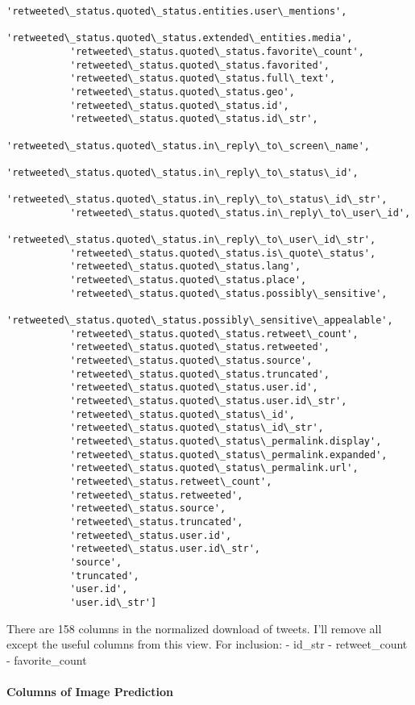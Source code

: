 \documentclass[11pt]{article}
\begin{document}
\begin{Verbatim}[commandchars=\\\{\}]
           'retweeted\_status.quoted\_status.entities.user\_mentions',
           'retweeted\_status.quoted\_status.extended\_entities.media',
           'retweeted\_status.quoted\_status.favorite\_count',
           'retweeted\_status.quoted\_status.favorited',
           'retweeted\_status.quoted\_status.full\_text',
           'retweeted\_status.quoted\_status.geo',
           'retweeted\_status.quoted\_status.id',
           'retweeted\_status.quoted\_status.id\_str',
           'retweeted\_status.quoted\_status.in\_reply\_to\_screen\_name',
           'retweeted\_status.quoted\_status.in\_reply\_to\_status\_id',
           'retweeted\_status.quoted\_status.in\_reply\_to\_status\_id\_str',
           'retweeted\_status.quoted\_status.in\_reply\_to\_user\_id',
           'retweeted\_status.quoted\_status.in\_reply\_to\_user\_id\_str',
           'retweeted\_status.quoted\_status.is\_quote\_status',
           'retweeted\_status.quoted\_status.lang',
           'retweeted\_status.quoted\_status.place',
           'retweeted\_status.quoted\_status.possibly\_sensitive',
           'retweeted\_status.quoted\_status.possibly\_sensitive\_appealable',
           'retweeted\_status.quoted\_status.retweet\_count',
           'retweeted\_status.quoted\_status.retweeted',
           'retweeted\_status.quoted\_status.source',
           'retweeted\_status.quoted\_status.truncated',
           'retweeted\_status.quoted\_status.user.id',
           'retweeted\_status.quoted\_status.user.id\_str',
           'retweeted\_status.quoted\_status\_id',
           'retweeted\_status.quoted\_status\_id\_str',
           'retweeted\_status.quoted\_status\_permalink.display',
           'retweeted\_status.quoted\_status\_permalink.expanded',
           'retweeted\_status.quoted\_status\_permalink.url',
           'retweeted\_status.retweet\_count',
           'retweeted\_status.retweeted',
           'retweeted\_status.source',
           'retweeted\_status.truncated',
           'retweeted\_status.user.id',
           'retweeted\_status.user.id\_str',
           'source',
           'truncated',
           'user.id',
           'user.id\_str']
\end{Verbatim}
            
    There are 158 columns in the normalized download of tweets. I'll remove
all except the useful columns from this view. For inclusion: - id\_str -
retweet\_count - favorite\_count

    \paragraph{Columns of Image
Prediction}\label{columns-of-image-prediction}
\end{document}
